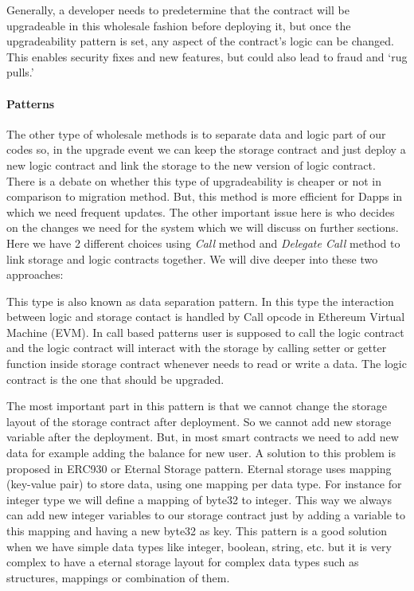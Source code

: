  Generally, a developer needs to predetermine that the contract will be upgradeable in this wholesale fashion before deploying it, but once the upgradeability pattern is set, any aspect of the contract's logic can be changed. This enables security fixes and new features, but could also lead to fraud and `rug pulls.'


\paragraph{ Patterns}


The other type of wholesale methods is to separate data and logic part of our codes so, in the upgrade event we can keep the storage contract and just deploy a new logic contract and link the storage to the new version of logic contract.
There is a debate on whether this type of upgradeability is cheaper or not in comparison to migration method. But, this method is more efficient for Dapps in which we need frequent updates. The other important issue here is who decides on the changes we need for the system which we will discuss on further sections.
Here we have 2 different choices using \textit{Call} method and \textit{Delegate Call} method to link storage and logic contracts together. We will dive deeper into these two approaches:



This type is also known as data separation pattern. In this type the interaction between logic and storage contact is handled by Call opcode in Ethereum Virtual Machine (EVM). In call based patterns user is supposed to call the logic contract and the logic contract will interact with the storage by calling setter or getter function inside storage contract whenever needs to read or write a data. The logic contract is the one that should be upgraded.

The most important part in this pattern is that we cannot change the storage layout of the storage contract after deployment. So we cannot add new storage variable after the deployment. But, in most smart contracts we need to add new data for example adding the balance for new user. A solution to this problem is proposed in ERC930 or Eternal Storage pattern. Eternal storage uses mapping (key-value pair) to store data, using one mapping per data type. For instance for integer type we will define a mapping of byte32 to integer. This way we always can add new integer variables to our storage contract just by adding a variable to this mapping and having a new byte32 as key. This pattern is a good solution when we have simple data types like integer, boolean, string, etc. but it is very complex to have a eternal storage layout for complex data types such as structures, mappings or combination of them.

